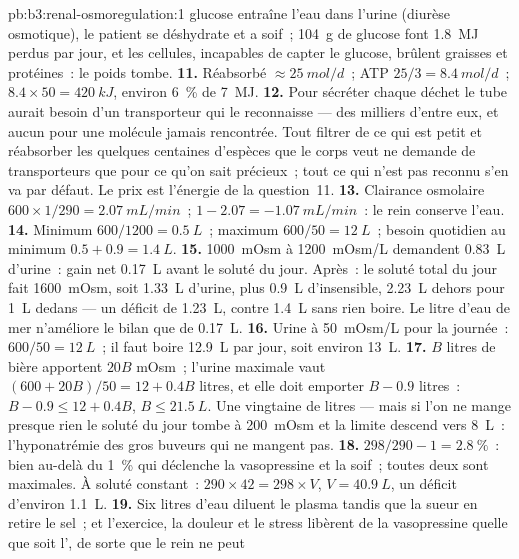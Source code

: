 \begin{solution}{pb:b3:renal-osmoregulation:1}
glucose entraîne l'eau dans l'urine (diurèse osmotique), le patient se
déshydrate et a soif~; \qty{104}{g} de glucose font \qty{1.8}{MJ} perdus
par jour, et les cellules, incapables de capter le glucose, brûlent
graisses et protéines~: le poids tombe.
\textbf{11.} Réabsorbé $\approx \qty{25}{mol/d}$~; ATP $25/3 =
\qty{8.4}{mol/d}$~; $8.4\times 50 = \qty{420}{kJ}$, environ
\qty{6}{\%} de \qty{7}{MJ}.
\textbf{12.} Pour sécréter chaque déchet le tube aurait besoin d'un
transporteur qui le reconnaisse --- des milliers d'entre eux, et aucun
pour une molécule jamais rencontrée. Tout filtrer de ce qui est petit et
réabsorber les quelques centaines d'espèces que le corps veut ne demande
de transporteurs que pour ce qu'on sait précieux~; tout ce qui n'est pas
reconnu s'en va par défaut. Le prix est l'énergie de la question~11.
\textbf{13.} Clairance osmolaire $600\times 1/290 = \qty{2.07}{mL/min}$~;
 $1 - 2.07 = -\qty{1.07}{mL/min}$~: le rein
conserve l'eau.
\textbf{14.} Minimum $600/1200 = \qty{0.5}{L}$~; maximum $600/50 =
\qty{12}{L}$~; besoin quotidien au minimum $0.5 + 0.9 = \qty{1.4}{L}$.
\textbf{15.} \qty{1000}{mOsm} à \qty{1200}{mOsm/L} demandent
\qty{0.83}{L} d'urine~: gain net \qty{0.17}{L} avant le soluté du jour.
Après~: le soluté total du jour fait \qty{1600}{mOsm}, soit \qty{1.33}{L}
d'urine, plus \qty{0.9}{L} d'insensible, \qty{2.23}{L} dehors pour
\qty{1}{L} dedans --- un déficit de \qty{1.23}{L}, contre \qty{1.4}{L}
sans rien boire. Le litre d'eau de mer n'améliore le bilan que de
\qty{0.17}{L}.
\textbf{16.} Urine à \qty{50}{mOsm/L} pour la journée~: $600/50 =
\qty{12}{L}$~; il faut boire \qty{12.9}{L} par jour, soit environ \qty{13}{L}.
\textbf{17.} $B$ litres de bière apportent $20B$ mOsm~; l'urine maximale
vaut $(600 + 20B)/50 = 12 + 0.4B$ litres, et elle doit emporter $B - 0.9$
litres~: $B - 0.9 \le 12 + 0.4B$, $B \le \qty{21.5}{L}$. Une vingtaine
de litres --- mais si l'on ne mange presque rien le soluté du jour tombe
à \qty{200}{mOsm} et la limite descend vers \qty{8}{L}~:
l'hyponatrémie des gros buveurs qui ne mangent pas.
\textbf{18.} $298/290 - 1 = \qty{2.8}{\%}$~: bien au-delà du \qty{1}{\%}
qui déclenche la vasopressine et la soif~; toutes deux sont maximales.
À soluté constant~: $290\times 42 = 298\times V$, $V = \qty{40.9}{L}$, un
déficit d'environ \qty{1.1}{L}.
\textbf{19.} Six litres d'eau diluent le plasma tandis que la sueur en
retire le sel~; et l'exercice, la douleur et le stress libèrent de la
vasopressine quelle que soit l', de sorte que le rein ne peut

\end{solution}
